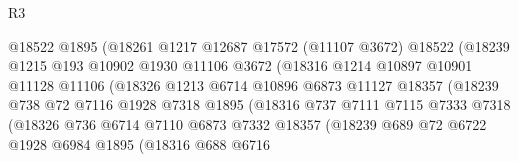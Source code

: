 \begin{lexlean}{R3}
\begin{coremodule}
                              @18522
                              @1895
                              (@18261
                                @1217
                                @12687
                                @17572
                                (@11107 @3672)
                                @18522
                                (@18239
                                  @1215
                                  @193
                                  @10902
                                  @1930
                                  @11106
                                  @3672
                                  (@18316
                                    @1214
                                    @10897
                                    @10901
                                    @11128
                                    @11106
                                    (@18326
                                      @1213
                                      @6714
                                      @10896
                                      @6873
                                      @11127
                                      @18357
                                      (@18239
                                        @738
                                        @72
                                        @7116
                                        @1928
                                        @7318
                                        @1895
                                        (@18316
                                          @737
                                          @7111
                                          @7115
                                          @7333
                                          @7318
                                          (@18326
                                            @736
                                            @6714
                                            @7110
                                            @6873
                                            @7332
                                            @18357
                                            (@18239
                                              @689
                                              @72
                                              @6722
                                              @1928
                                              @6984
                                              @1895
                                              (@18316
                                                @688
                                                @6716

\end{coremodule}
\end{lexlean}
